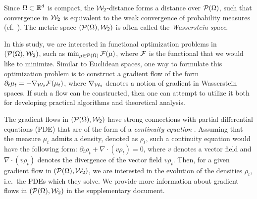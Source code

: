 Since $\Omega \subset \mathbb{R}^d$ is compact, the ${\cal W}_2$-distance forms a distance over ${\cal P}(\Omega)$, such that convergence in ${\cal W}_2$ is equivalent to the weak convergence of probability measures (cf.\ \cite[Theorem 2.1]{santambrogio2010introduction}). The metric space $({\cal P}(\Omega),{\cal W}_2) $ is often called the \emph{Wasserstein space}.

In this study, we are interested in functional optimization problems in $({\cal P}(\Omega),{\cal W}_2)$, such as $\min_{\mu\in{\cal P}(\Omega)} {\cal F}(\mu)$, where ${\cal F}$ is the functional that we would like to minimize. Similar to Euclidean spaces, one way to formulate this optimization problem is to construct a gradient flow of the form $\partial_t \mu_t = - \nabla_{{\cal W}_2} {\cal F}(\mu_t)$, where $\nabla_{{\cal W}_2}$ denotes a notion of gradient in Wasserstein spaces. If such a flow can be constructed, then one can attempt to utilize it both for developing practical algorithms and theoretical analysis.

The gradient flows in $({\cal P}(\Omega),{\cal W}_2)$ have strong connections with partial differential equations (PDE) that are of the form of a \emph{continuity equation} \cite{santambrogio2017euclidean}. Assuming that the measure $\mu_t$ admits a density, denoted as $\rho_t$, such a continuity equation would have the following form:
$\partial_t \rho_t + \nabla \cdot (v \rho_t) = 0$, %
where $v$ denotes a vector field and $\nabla \cdot (v \rho_t)$ denotes the divergence of the vector field $v\rho_t$. Then, for a given gradient flow in $({\cal P}(\Omega),{\cal W}_2)$, we are interested in the evolution of the densities $\rho_t$, i.e.\ the PDEs which they solve.
%
We provide more information about gradient flows in $({\cal P}(\Omega),{\cal W}_2)$ in the supplementary document.


